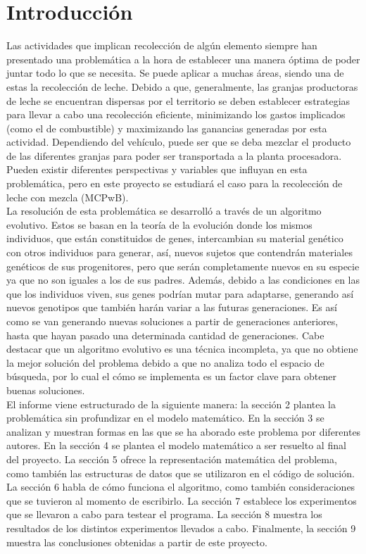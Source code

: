 \documentclass[letter, 10pt]{article}
\begin{document}
\section{Introducci\'on}

Las actividades que implican recolecci\'on de alg\'un elemento siempre han presentado una problem\'atica a la hora de establecer una manera \'optima de poder juntar todo lo que se necesita. Se puede aplicar a muchas \'areas, siendo una de estas la recolecci\'on de leche. Debido a que, generalmente, las granjas productoras de leche se encuentran dispersas por el territorio se deben establecer estrategias para llevar a cabo una recolecci\'on eficiente, minimizando los gastos implicados (como el de combustible) y maximizando las ganancias generadas por esta actividad. Dependiendo del veh\'iculo, puede ser que se deba mezclar el producto de las diferentes granjas para poder ser transportada a la planta procesadora. Pueden existir diferentes perspectivas y variables que influyan en esta problem\'atica, pero en este proyecto se estudiar\'a el caso para la recolecci\'on de leche con mezcla (MCPwB).\\

La resolución de esta problemática se desarrolló a través de un algoritmo evolutivo. Estos se basan en la teoría de la evolución donde los mismos individuos, que están constituidos de genes, intercambian su material genético con otros individuos para generar, así, nuevos sujetos que contendrán materiales genéticos de sus progenitores, pero que serán completamente nuevos en su especie ya que no son iguales a los de sus padres. Además, debido a las condiciones en las que los individuos viven, sus genes podrían mutar para adaptarse, generando así nuevos genotipos que también harán variar a las futuras generaciones. Es así como se van generando nuevas soluciones a partir de generaciones anteriores, hasta que hayan pasado una determinada cantidad de generaciones. Cabe destacar que un algoritmo evolutivo es una técnica incompleta, ya que no obtiene la mejor solución del problema debido a que no analiza todo el espacio de búsqueda, por lo cual el cómo se implementa es un factor clave para obtener buenas soluciones. \\

El informe viene estructurado de la siguiente manera: la secci\'on 2 plantea la problem\'atica sin profundizar en el modelo matem\'atico. En la secci\'on 3 se analizan y muestran formas en las que se ha aborado este problema por diferentes autores. En la secci\'on 4 se plantea el modelo matem\'atico a ser resuelto al final del proyecto. La secci\'on 5 ofrece la representación matemática del problema, como también las estructuras de datos que se utilizaron en el código de solución. La sección 6 habla de cómo funciona el algoritmo, como también consideraciones que se tuvieron al momento de escribirlo. La sección 7 establece los experimentos que se llevaron a cabo para testear el programa. La sección 8 muestra los resultados de los distintos experimentos llevados a cabo. Finalmente, la sección 9 muestra las conclusiones obtenidas a partir de este proyecto.
\end{document}
